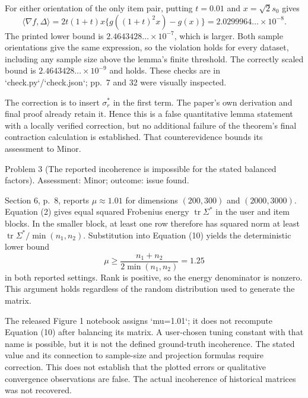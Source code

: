 \documentclass[10pt]{article}
\begin{document}
For either orientation of the only item pair, putting \(t=0.01\) and \(x=\sqrt2s_0\) gives \[\langle\nabla f,\Delta\rangle
 =2t(1+t)x\{g((1+t)^2x)-g(x)\}
 =2.0299964\ldots\times10^{-8}.\] The printed lower bound is \(2.4643428\ldots\times10^{-7}\), which is larger. Both sample orientations give the same expression, so the violation holds for every dataset, including any sample size above the lemma’s finite threshold. The correctly scaled bound is \(2.4643428\ldots\times10^{-9}\) and holds. These checks are in `check.py`/`check.json`; pp. 7 and 32 were visually inspected.\par
The correction is to insert \(\sigma_r^*\) in the first term. The paper’s own derivation and final proof already retain it. Hence this is a false quantitative lemma statement with a locally verified correction, but no additional failure of the theorem’s final contraction calculation is established. That counterevidence bounds its assessment to Minor.\par
Problem 3 (The reported incoherence is impossible for the stated balanced factors).  Assessment: Minor; outcome: issue found.\par
Section 6, p. 8, reports \(\mu\approx1.01\) for dimensions \((200,300)\) and \((2000,3000)\). Equation (2) gives equal squared Frobenius energy \(\operatorname{tr}\Sigma^*\) in the user and item blocks. In the smaller block, at least one row therefore has squared norm at least \(\operatorname{tr}\Sigma^*/\min(n_1,n_2)\). Substitution into Equation (10) yields the deterministic lower bound \[\mu\ge\frac{n_1+n_2}{2\min(n_1,n_2)}=1.25\] in both reported settings. Rank is positive, so the energy denominator is nonzero. This argument holds regardless of the random distribution used to generate the matrix.\par
The released Figure 1 notebook assigns `mu=1.01`; it does not recompute Equation (10) after balancing its matrix. A user-chosen tuning constant with that name is possible, but it is not the defined ground-truth incoherence. The stated value and its connection to sample-size and projection formulas require correction. This does not establish that the plotted errors or qualitative convergence observations are false. The actual incoherence of historical matrices was not recovered.\par
\end{document}
